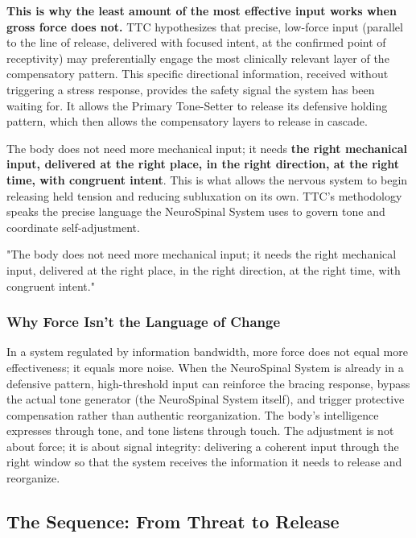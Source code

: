 \documentclass[11pt,letterpaper]{article}
\begin{document}
\textbf{This is why the least amount of the most effective input works when gross force does not.} TTC hypothesizes that precise, low-force input (parallel to the line of release, delivered with focused intent, at the confirmed point of receptivity) may preferentially engage the most clinically relevant layer of the compensatory pattern. This specific directional information, received without triggering a stress response, provides the safety signal the system has been waiting for. It allows the Primary Tone-Setter to release its defensive holding pattern, which then allows the compensatory layers to release in cascade.


The body does not need more mechanical input; it needs \textbf{the right mechanical input, delivered at the right place, in the right direction, at the right time, with congruent intent}. This is what allows the nervous system to begin releasing held tension and reducing subluxation on its own. TTC's methodology speaks the precise language the NeuroSpinal System uses to govern tone and coordinate self-adjustment.


\begin{pullquotebox}
"The body does not need more mechanical input; it needs the right mechanical input, delivered at the right place, in the right direction, at the right time, with congruent intent."
\end{pullquotebox}


\subsubsection{Why Force Isn't the Language of Change}

In a system regulated by information bandwidth, more force does not equal more effectiveness; it equals more noise. When the NeuroSpinal System is already in a defensive pattern, high-threshold input can reinforce the bracing response, bypass the actual tone generator (the NeuroSpinal System itself), and trigger protective compensation rather than authentic reorganization. The body's intelligence expresses through tone, and tone listens through touch. The adjustment is not about force; it is about signal integrity: delivering a coherent input through the right window so that the system receives the information it needs to release and reorganize.


\subsection{The Sequence: From Threat to Release}
\end{document}
